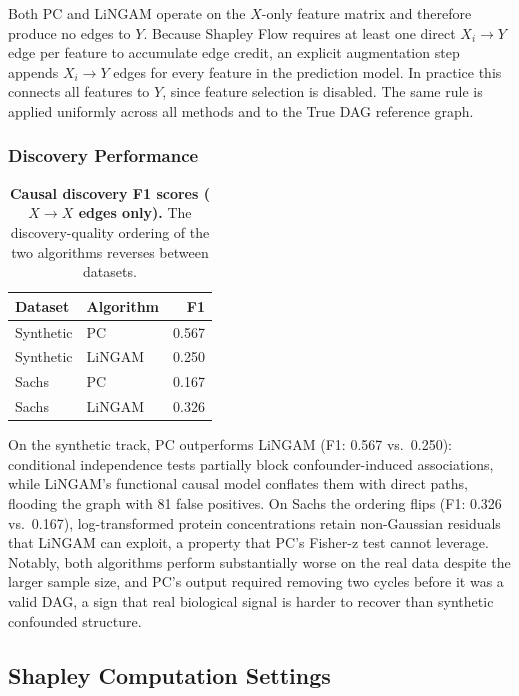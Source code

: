 \documentclass[12pt,a4paper,oneside]{article}
\begin{document}
Both PC and LiNGAM operate on the $X$-only feature matrix and therefore produce no edges to $Y$. Because Shapley Flow requires at least one direct $X_i \to Y$ edge per feature to accumulate edge credit, an explicit augmentation step appends $X_i \to Y$ edges for every feature in the prediction model. In practice this connects all features to $Y$, since feature selection is disabled. The same rule is applied uniformly across all methods and to the True DAG reference graph.

\subsubsection{Discovery Performance}

\begin{table}[H]
  \centering
  \caption{\textbf{Causal discovery F1 scores ($X \to X$ edges only).} The discovery-quality ordering of the two algorithms reverses between datasets.}
  \label{tab:discovery_f1}
  \begin{tabular}{llr}
    \toprule
    \textbf{Dataset} & \textbf{Algorithm} & \textbf{F1} \\
    \midrule
    Synthetic & PC       & 0.567 \\
    Synthetic & LiNGAM   & 0.250 \\
    \midrule
    Sachs     & PC       & 0.167 \\
    Sachs     & LiNGAM   & 0.326 \\
    \bottomrule
  \end{tabular}
\end{table}

On the synthetic track, PC outperforms LiNGAM (F1: 0.567 vs.\ 0.250): conditional independence tests partially block confounder-induced associations, while LiNGAM's functional causal model conflates them with direct paths, flooding the graph with 81 false positives. On Sachs the ordering flips (F1: 0.326 vs.\ 0.167), log-transformed protein concentrations retain non-Gaussian residuals that LiNGAM can exploit, a property that PC's Fisher-z test cannot leverage. Notably, both algorithms perform substantially worse on the real data despite the larger sample size, and PC's output required removing two cycles before it was a valid DAG, a sign that real biological signal is harder to recover than synthetic confounded structure.

\subsection{Shapley Computation Settings}
\end{document}
